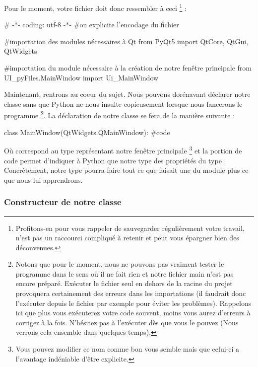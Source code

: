 Pour le moment, votre fichier doit donc ressembler à ceci
\footnote
{
Profitons-en pour vous rappeler de sauvegarder régulièrement votre travail, \textcolor{red}{} n'est pas un raccourci compliqué à retenir et peut vous épargner bien des déconvenues.
}
:
\begin{pyCode}
# -*- coding: utf-8 -*-
#on explicite l’encodage du fichier

#importation des modules nécessaires à Qt
from PyQt5 import QtCore, QtGui, QtWidgets

#importation du module nécessaire à la création de notre fenêtre principale
from UI_pyFiles.MainWindow import Ui_MainWindow
\end{pyCode}
\smallSkip %

Maintenant, rentrons au coeur du sujet. Nous pouvons dorénavant déclarer notre classe sans que Python ne nous insulte copieusement lorsque nous lancerons le programme
\footnote
{
Notons que pour le moment, nous ne pouvons pas vraiment tester le programme dans le sens où il ne fait rien et notre fichier main n'est pas encore préparé. Exécuter le fichier seul en dehors de la racine du projet provoquera certainement des erreurs dans les importations (il faudrait donc l'exécuter depuis le fichier  par exemple pour éviter les problèmes).\newline
Rappelons ici que plus vous exécuterez votre code souvent, moins vous aurez d'erreurs à corriger à la fois. N'hésitez pas à l'exécuter dès que vous le pouvez (Nous verrons cela ensemble dans quelques temps).
}.\newline
La déclaration de notre classe se fera de la manière suivante :
\begin{pyCode}
class MainWindow(QtWidgets.QMainWindow):
    #code
\end{pyCode}
Où  correspond au type représentant notre fenêtre principale
\footnote
{
Vous pouvez modifier ce nom comme bon vous semble mais que celui-ci a l'avantage indéniable d'être explicite.
}
et la portion de code  permet d'indiquer à Python que notre type   des propriétés du type .\newline
Concrètement, notre type pourra faire tout ce que faisait une  du module  plus ce que nous lui apprendrons.


\subsubsection{Constructeur de notre classe}

